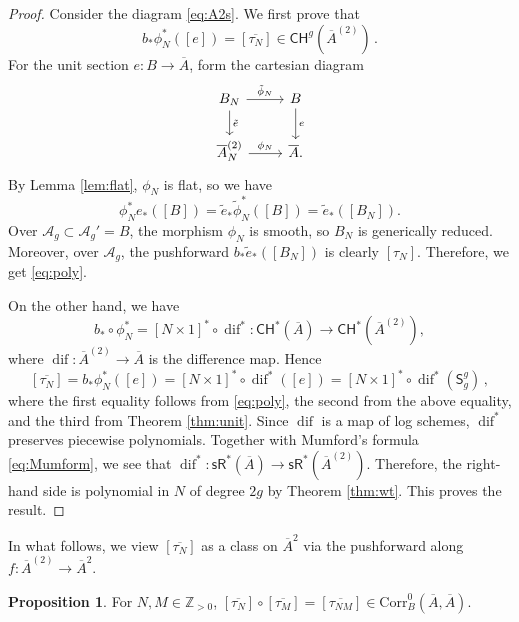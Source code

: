 \documentclass[11pt]{article}
\def\CH{\mathsf{CH}}
\def\A{\mathcal{A}}
\def\ZZ{\mathbb{Z}}
\def\sR{\mathsf{sR}}
\newcommand{\barA}{\overline{A}}
\newcommand{\sfS}{\mathsf{S}}
\newcommand{\corr}{\mathrm{Corr}}
\newcommand{\diff}{\operatorname{dif}}
\theoremstyle{definition}
\newtheorem{proposition}[definition]{Proposition}
\begin{document}
\begin{proof}
    Consider the diagram \eqref{eq:A2s}. We first prove that
    \begin{equation}\label{eq:poly}
        b_*\phi_N^*([e]) = [\overline{\tau_N}] \in \CH^g(\barA^{(2)})\,.
    \end{equation}
    For the unit section $e : B \to \barA$, form the cartesian diagram
    \[
    \begin{tikzcd}
        B_N \ar[r,"\tilde{\phi}_N"] \ar[d,"\tilde{e}"] &
        B \ar[d,"e"]\\
        \barA_N^{(2)} \ar[r,"\phi_N"] &
        \barA .
    \end{tikzcd}
    \]
    By Lemma \ref{lem:flat}, $\phi_N$ is flat, so we have
    \[
    \phi_N^* e_*([B])
    =
    \tilde e_*\tilde\phi_N^*([B])
    =
    \tilde e_*([B_N]).
    \]
    Over $\A_g \subset \A_g'=B$, the morphism $\phi_N$ is smooth, so $B_N$ is
    generically reduced. Moreover, over $\A_g$, the pushforward
    $b_*\tilde e_*([B_N])$ is clearly $[\tau_N]$. Therefore, we get \eqref{eq:poly}.

    On the other hand, we have
    \[
    b_*\circ \phi_N^* = [N\times 1]^* \circ \diff^* : \CH^*(\barA) \to \CH^*(\barA^{(2)}),
    \]
    where $\diff : \barA^{(2)} \to \barA$ is the difference map. Hence
    \begin{equation}\label{eq:taudelta}
    [\overline{\tau_N}] = b_*\phi_N^*([e])
    =
    [N \times 1]^*\circ\diff^*([e])
    =
    [N \times 1]^*\circ\diff^*(\sfS_g^g)\,,
    \end{equation}
    where the first equality follows from \eqref{eq:poly}, the second from the above equality, and the third from Theorem \ref{thm:unit}. Since $\diff$ is a map of log schemes, $\diff^*$ preserves piecewise polynomials. Together with Mumford's formula \eqref{eq:Mumform}, we see that $\diff^* : \sR^*(\barA) \to \sR^*(\barA^{(2)})$. Therefore, the right-hand side is polynomial in $N$ of degree $2g$ by Theorem \ref{thm:wt}. This proves the result.
\end{proof}

In what follows, we view $[\overline{\tau_N}]$ as a class on
$\barA^2$ via the pushforward along $f: \barA^{(2)} \to \barA^2$.

\begin{proposition}\label{pro:nm}
    For $N,M \in \ZZ_{>0}$, $[\overline{\tau_N}] \circ [\overline{\tau_M}] = [\overline{\tau_{NM}}] \in \corr_B^0(\barA,\barA)$.
\end{proposition}
\end{document}
